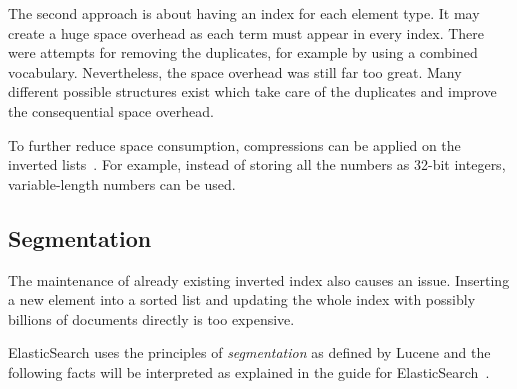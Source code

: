 The second approach is about having an index for each element type. It may create a huge space overhead as each term must appear in every index. There were attempts for removing the duplicates, for example by using a combined vocabulary. Nevertheless, the space overhead was still far too great.
Many different possible structures exist which take care of the duplicates and improve the consequential space overhead.

To further reduce space consumption, compressions can be applied on the inverted lists~\cite{invindex}. For example, instead of storing all the numbers as 32-bit integers, variable-length numbers can be used.

\subsection{Segmentation}
The maintenance of already existing inverted index also causes an issue. Inserting a new element into a sorted list and updating the whole index with possibly billions of documents directly is too expensive.

ElasticSearch uses the principles of \emph{segmentation} as defined by Lucene and the following facts will be interpreted as explained in the guide for ElasticSearch~\cite{elastic}. 

